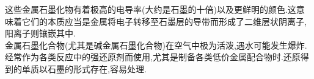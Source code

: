 \documentclass[draft]{ctexart}
\begin{document}
\begin{figure}[H]
    \centering
\end{figure}
这些金属石墨化物有着极高的电导率(大约是石墨的十倍)以及更鲜明的颜色.这意味着它们的本质应当是金属将电子转移至石墨层的导带而形成了二维层状阴离子,阳离子则镶嵌其中.\\
\indent 金属石墨化合物(尤其是碱金属石墨化合物)在空气中极为活泼,遇水可能发生爆炸.经常作为各类反应中的强还原剂而使用,尤其是制备各类低价金属配合物时.还原得到的单质以石墨的形式存在,容易处理.
\end{document}
